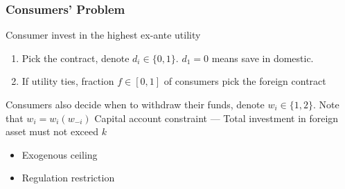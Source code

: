 \begin{frame}
    \frametitle{Consumers' Problem}

    Consumer invest in the highest ex-ante utility
    \begin{enumerate}
        \item Pick the contract, denote $d_i\in\{0,1\}$. $d_1=0$ means save in domestic.
        \item If utility ties, fraction $f\in[0,1]$ of consumers pick the foreign contract
    \end{enumerate}

    Consumers also decide when to withdraw their funds, denote $w_i\in \{1,2\}$. Note that $w_i=w_i (w_{-i})$
    \vfill
    Capital account constraint --- Total investment in foreign asset must not exceed $k$
    \begin{itemize}
        \item Exogenous ceiling
        \item Regulation restriction
    \end{itemize}
\end{frame}